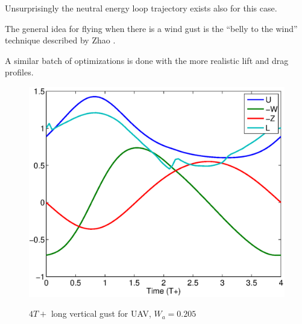 Unsurprisingly the neutral energy loop trajectory exists also for this case.

\par The general idea for flying when there is a wind gust is the ``belly to the wind'' technique described by Zhao \cite{zhao2004optimal}.

\FloatBarrier

\par A similar batch of optimizations is done with the more realistic lift and drag profiles.

\begin{figure}
  \begin{center}
   \scalebox{0.8}
   {\includegraphics{./Figures/Windtype=1_Tg=4_Wg=0p205_UAV_alphamax=12.eps}}
  \end{center}
  \caption{$4T+$ long vertical gust for UAV, $W_a=0.205$}
  \label{fig:vertical_optimization_UAV}
\end{figure}


